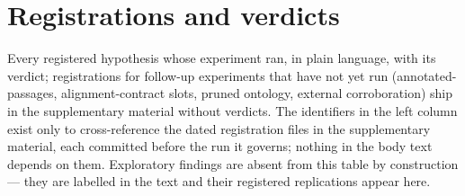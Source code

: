 \documentclass{article}
\begin{document}
\section{Registrations and verdicts}\label{app:ledger}

Every registered hypothesis whose experiment ran, in plain language, with
its verdict; registrations for follow-up experiments that have not yet run
(annotated-passages, alignment-contract slots, pruned ontology, external
corroboration) ship in the supplementary material without verdicts. The identifiers in the left column exist only to cross-reference
the dated registration files in the supplementary material, each committed
before the run it governs; nothing in the body text depends on them.
Exploratory findings are absent from this table by construction --- they
are labelled in the text and their registered replications appear here.
\end{document}

